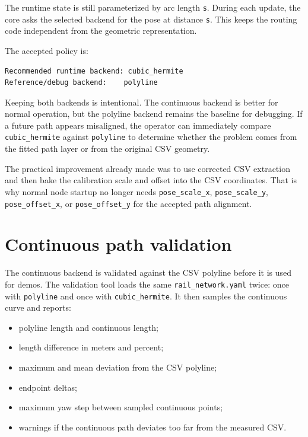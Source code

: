 \documentclass[12pt,a4paper]{report}
\newcommand{\codenext}[1]{\par\Needspace{#1\baselineskip}}
\begin{document}
The runtime state is still parameterized by arc length \texttt{s}. During each
update, the core asks the selected backend for the pose at distance \texttt{s}.
This keeps the routing code independent from the geometric representation.

\codenext{42}


The accepted policy is:

\begin{lstlisting}[style=terminalcode]
Recommended runtime backend: cubic_hermite
Reference/debug backend:    polyline
\end{lstlisting}

Keeping both backends is intentional. The continuous backend is better for
normal operation, but the polyline backend remains the baseline for debugging.
If a future path appears misaligned, the operator can immediately compare
\texttt{cubic\_hermite} against \texttt{polyline} to determine whether the
problem comes from the fitted path layer or from the original CSV geometry.

The practical improvement already made was to use corrected CSV extraction and
then bake the calibration scale and offset into the CSV coordinates. That is
why normal node startup no longer needs \texttt{pose\_scale\_x},
\texttt{pose\_scale\_y}, \texttt{pose\_offset\_x}, or
\texttt{pose\_offset\_y} for the accepted path alignment.

\section{Continuous path validation}

The continuous backend is validated against the CSV polyline before it is used
for demos. The validation tool loads the same \texttt{rail\_network.yaml} twice:
once with \texttt{polyline} and once with \texttt{cubic\_hermite}. It then
samples the continuous curve and reports:

\begin{itemize}
\item polyline length and continuous length;
\item length difference in meters and percent;
\item maximum and mean deviation from the CSV polyline;
\item endpoint deltas;
\item maximum yaw step between sampled continuous points;
\item warnings if the continuous path deviates too far from the measured CSV.
\end{itemize}
\end{document}
